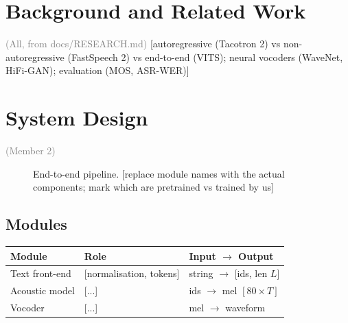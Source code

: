 \documentclass[11pt,a4paper]{article}
\newcommand{\ph}[1]{\colorbox{red!12}{\textcolor{red!70!black}{\small\textsf{[#1]}}}}
\newcommand{\owner}[1]{\hfill{\small\textcolor{gray}{(#1)}}}
\begin{document}
\section{Background and Related Work}\owner{All, from docs/RESEARCH.md}
\ph{autoregressive (Tacotron 2) vs non-autoregressive (FastSpeech 2) vs end-to-end (VITS); neural vocoders (WaveNet, HiFi-GAN); evaluation (MOS, ASR-WER)}

\section{System Design}\owner{Member 2}
\begin{figure}[h]
\centering
{}
\caption{End-to-end pipeline. \ph{replace module names with the actual components; mark which are pretrained vs trained by us}}
\label{fig:pipeline}
\end{figure}

\subsection{Modules}
\begin{tabularx}{\linewidth}{@{}lXl@{}}
\toprule
Module & Role & Input $\rightarrow$ Output \\ \midrule
Text front-end & \ph{normalisation, tokens} & string $\rightarrow$ \ph{ids, len $L$} \\
Acoustic model & \ph{...} & ids $\rightarrow$ mel $[80\times T]$ \\
Vocoder & \ph{...} & mel $\rightarrow$ waveform \\ \bottomrule
\end{tabularx}
\end{document}
